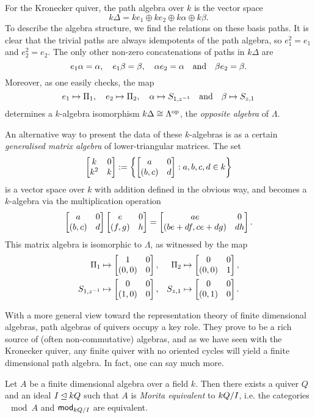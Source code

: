 \begin{example}
  For the Kronecker quiver, the path algebra over $k$ is the vector space
  \[
    k\Delta = k e_1 \oplus k e_2 \oplus k \alpha \oplus k \beta.
  \]
  To describe the algebra structure, we find the relations on these basis paths.
  It is clear that the trivial paths are always idempotents of the
  path algebra, so $e_1^2 = e_1$ and $e_2^2 = e_2$.
  The only other non-zero concatenations of paths in $k \Delta$ are
  \[
    e_1 \alpha  = \alpha, \quad
    e_1 \beta = \beta, \quad
    \alpha e_2 = \alpha \quad \text{and} \quad
    \beta e_2 = \beta.
  \]
  Moreover, as one easily checks, the map
  \[
    e_1 \mapsto \Pi_1,
    \quad
    e_2 \mapsto \Pi_2,
    \quad
    \alpha \mapsto S_{1, z^{-1}}
    \quad \text{and} \quad
    \beta \mapsto S_{z, 1}
  \]
  determines a $k$-algebra isomorphism $k \Delta \cong {\Lambda}^{\mathrm{op}}$,
  the \emph{opposite algebra} of $\Lambda$.
\end{example}

\begin{remark}
  An alternative way to present the data of these $k$-algebras is as
  a certain \emph{generalised matrix algebra} of lower-triangular matrices.
  The set
  \[
    \begin{bmatrix} {k} & {0} \\ {k^2} & {k} \end{bmatrix}
    :=
    \left\{
      \begin{bmatrix} {a} & {0} \\ {(b, c)} & {d} \end{bmatrix}: a, b, c, d \in k
    \right\}
  \]
  is a vector space over $k$ with addition defined in the obvious
  way, and becomes a $k$-algebra via the multiplication operation
  \[
    \begin{bmatrix} {a} & {0} \\ {(b, c)} & {d} \end{bmatrix} \begin{bmatrix} {e} & {0} \\ {(f, g)} & {h} \end{bmatrix}
    =
    \begin{bmatrix} {ae} & {0} \\ {(be + df, ce + dg)} & {dh} \end{bmatrix}.
  \]
  This matrix algebra is isomorphic to $\Lambda$, as witnessed by the map
  \begin{align*}
    \Pi_1 &\mapsto \begin{bmatrix} {1} & {0} \\ {(0, 0)} & {0} \end{bmatrix}, & \Pi_2 &\mapsto
    \begin{bmatrix} {0} & {0} \\ {(0, 0)} & {1} \end{bmatrix}, \\
    S_{1, z^{-1}} &\mapsto \begin{bmatrix} {0} & {0} \\ {(1, 0)} & {0} \end{bmatrix}, & S_{z, 1}
    &\mapsto \begin{bmatrix} {0} & {0} \\ {(0, 1)} & {0} \end{bmatrix}.
  \end{align*}
\end{remark}

With a more general view toward the representation theory of finite
dimensional algebras, path algebras of quivers occupy a key role.
They prove to be a rich source of (often non-commutative) algebras,
and as we have seen with the Kronecker quiver, any finite quiver with
no oriented cycles will yield a finite dimensional path algebra.
In fact, one can say much more.

\begin{theorem}[Gabriel]
  Let $A$ be a finite dimensional algebra over a field $k$.
  Then there exists a quiver $Q$ and an ideal $I \unlhd kQ$ such
  that $A$ is \emph{Morita equivalent} to ${kQ}\mathopen/{I}$, i.e. the
  categories $\mod{A}$ and ${\mathsf{mod}}_{{{kQ}\mathopen/{I}}}$ are equivalent.
\end{theorem}

